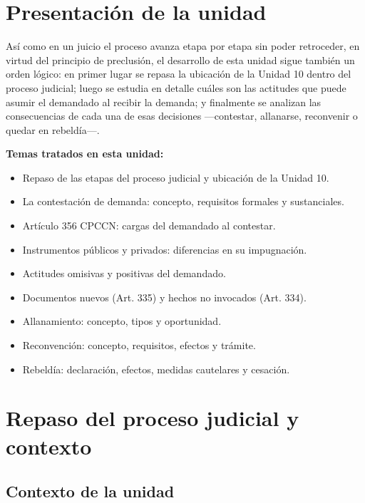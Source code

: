 \documentclass[12pt,oneside]{book}
\begin{document}
\chapter*{Presentación de la unidad}

Así como en un juicio el proceso avanza etapa por etapa sin poder retroceder, en virtud del principio de preclusión, el desarrollo de esta unidad sigue también un orden lógico: en primer lugar se repasa la ubicación de la Unidad 10 dentro del proceso judicial; luego se estudia en detalle cuáles son las actitudes que puede asumir el demandado al recibir la demanda; y finalmente se analizan las consecuencias de cada una de esas decisiones —contestar, allanarse, reconvenir o quedar en rebeldía—.

\textbf{Temas tratados en esta unidad:}
\begin{itemize}
    \item Repaso de las etapas del proceso judicial y ubicación de la Unidad 10.
    \item La contestación de demanda: concepto, requisitos formales y sustanciales.
    \item Artículo 356 CPCCN: cargas del demandado al contestar.
    \item Instrumentos públicos y privados: diferencias en su impugnación.
    \item Actitudes omisivas y positivas del demandado.
    \item Documentos nuevos (Art. 335) y hechos no invocados (Art. 334).
    \item Allanamiento: concepto, tipos y oportunidad.
    \item Reconvención: concepto, requisitos, efectos y trámite.
    \item Rebeldía: declaración, efectos, medidas cautelares y cesación.
\end{itemize}

\chapter{Repaso del proceso judicial y contexto}

\section{Contexto de la unidad}
\end{document}
